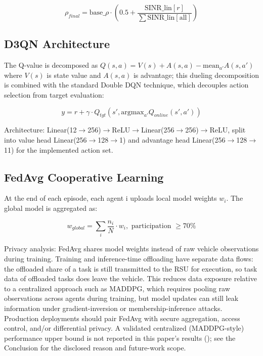\documentclass[journal,10pt,twocolumn]{IEEEtran}
\begin{document}
\begin{equation}
\label{eq:rho_final}
\rho_{final} = \text{base\_}\rho \cdot \left(0.5 + \frac{\text{SINR\_lin}[r]}{\sum \text{SINR\_lin}[\text{all}]}\right)
\end{equation}

\subsection{D3QN Architecture}

The Q-value is decomposed as $Q(s,a) = V(s) + A(s,a) - \text{mean}_{a'} A(s,a')$ where $V(s)$ is state value and $A(s,a)$ is advantage; this dueling decomposition is combined with the standard Double DQN technique, which decouples action selection from target evaluation:

\begin{equation}
\label{eq:ddqn}
y = r + \gamma \cdot Q_{tgt}(s', \text{argmax}_{a'} Q_{online}(s', a'))
\end{equation}

\begingroup\raggedright
Architecture: Linear(12$\rightarrow$256)$\rightarrow$\allowbreak ReLU$\rightarrow$\allowbreak Linear(256$\rightarrow$256)$\rightarrow$ReLU, split into value head Linear(256$\rightarrow$128$\rightarrow$1) and advantage head Linear(256$\rightarrow$128$\rightarrow$11) for the implemented action set.
\par\endgroup

\subsection{FedAvg Cooperative Learning}

At the end of each episode, each agent i uploads local model weights $w_i$. The global model is aggregated as:

\begin{equation}
\label{eq:fedavg}
w_{global} = \sum_i \frac{n_i}{N} \cdot w_i, \text{ participation } \geq 70\%
\end{equation}

Privacy analysis: FedAvg shares model weights instead of raw vehicle observations during training. Training and inference-time offloading have separate data flows: the offloaded share of a task is still transmitted to the RSU for execution, so task data of offloaded tasks does leave the vehicle. This reduces data exposure relative to a centralized approach such as MADDPG, which requires pooling raw observations across agents during training, but model updates can still leak information under gradient-inversion or membership-inference attacks. Production deployments should pair FedAvg with secure aggregation, access control, and/or differential privacy. A validated centralized (MADDPG-style) performance upper bound is not reported in this paper's results (); see the Conclusion for the disclosed reason and future-work scope.
\end{document}
